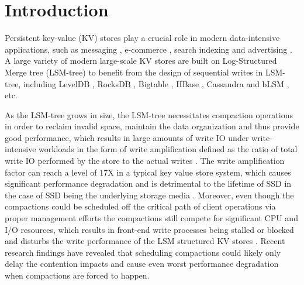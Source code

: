 \documentclass[sigconf]{acmart}
\begin{document}
\section{Introduction}
Persistent key-value (KV) stores play a crucial role in modern data-intensive applications, such as messaging \cite{HH,HBase}, e-commerce \cite{Dynamo}, search indexing \cite{LevelDB, Bigtable} and advertising \cite{RocksDB,PNUTS}. A large variety of  modern large-scale KV stores are built on Log-Structured Merge tree (LSM-tree) \cite{LSMtree} to benefit from the design of sequential writes in LSM-tree, including LevelDB \cite{LevelDB}, RocksDB \cite{RocksDB}, Bigtable \cite{Bigtable}, HBase \cite{HBase}, Cassandra \cite{Cassandra} and bLSM \cite{bLSM}, etc.

As the LSM-tree grows in size, the LSM-tree necessitates compaction operations in order to reclaim invalid space, maintain the data organization and thus provide good performance, which results in large amounts of write IO under write-intensive workloads \cite{LevelDB, HyperLevelDB, RocksDB} in the form of write amplification defined as the ratio of total write IO performed by the store to the actual writes \cite{LevelDB, PebblesDB}. The write amplification factor can reach a level of 17X \cite{Wisckey,PebblesDB} in a typical key value store system, which causes significant performance degradation and is detrimental to the lifetime of SSD in the case of SSD being the underlying storage media \cite{SSD, Wisckey, HashKV}. Moreover, even though the compactions could be scheduled off the critical path of client operations via proper management efforts \cite{SLMDB(FAST'2019),SILK(USENIX'2019),KVELL(SOSP'2019)} the compactions still compete for significant CPU and I/O resources, which results in front-end write processes being stalled or blocked and disturbs the write performance of the LSM structured KV stores \cite{TRIAD, PebblesDB}.  Recent research findings \cite{IOSchedule'USENIXE19} have revealed that scheduling compactions could likely only delay the contention impacts and cause even worst performance degradation when compactions are forced to happen. 
\end{document}
